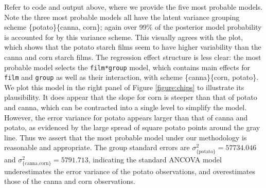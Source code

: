 
Refer to code and output above, where we provide the five most probable models. Note the three most probable models all have the latent variance grouping scheme \{potato\}\{canna, corn\}; again over 99\% of the posterior model probability is accounted for by this variance scheme. This visually agrees with the plot, which shows that the potato starch films seem to have higher variability than the canna and corn starch films. The regression effect structure is less clear: the most probable model selects the \texttt{film*group} model, which contains main effects for \texttt{film} and \texttt{group} as well as their interaction, with scheme \{canna\}\{corn, potato\}. We plot this model in the right panel of Figure \ref{figure:chips} to illustrate its plausibility. It does appear that the slope for corn is steeper than that of potato and canna, which can be contracted into a single level to simplify the model. However, the error variance for potato appears larger than that of canna and potato, as evidenced by the large spread of square potato points around the gray line. Thus we assert that the most probable model under our methodology is reasonable and appropriate. The group standard errors are $\sigma^2_{}=57734.046$ and $\sigma^2_{}=5791.713$, indicating the standard ANCOVA model underestimates the error variance of the potato observations, and overestimates those of the canna and corn observations. 

